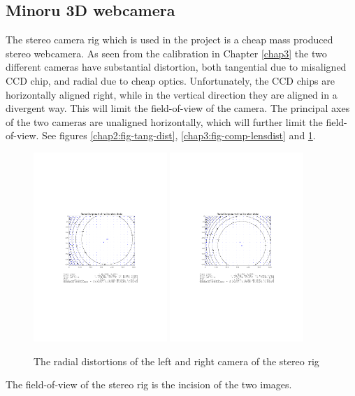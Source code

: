 \subsection{Minoru 3D webcamera}
The stereo camera rig which is used in the project is a cheap mass produced stereo
webcamera. As seen from the calibration in Chapter \ref{chap3} the two different cameras have substantial
distortion, both tangential due to misaligned CCD chip, and radial due to cheap optics.
Unfortunately, the CCD chips are horizontally aligned right, while in the vertical
direction they are aligned in a divergent way. This will limit the field-of-view of the
camera. The principal axes of the two cameras are unaligned horizontally, which will
further limit the field-of-view. See figures \ref{chap2:fig-tang-dist},
\ref{chap3:fig-comp-lensdist} and \ref{chap8:fig-rad-dist}.
\begin{figure}[htbp]
    \centering
    \includegraphics[width=0.45\textwidth]{pics/left_rad_dist}
    \includegraphics[width=0.45\textwidth]{pics/right_rad_dist}
    \caption{The radial distortions of the left and right camera of the stereo rig}
    \label{chap8:fig-rad-dist}
\end{figure}
The field-of-view of the stereo rig is the incision of the two images. 

